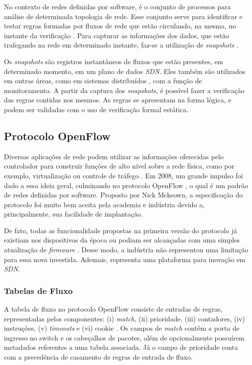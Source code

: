 \documentclass[12pt]{article}
\begin{document}
No contexto de redes definidas por software, é o conjunto de processos para análise de determinada topologia de rede. 
Esse conjunto serve para identificar e testar regras formadas por fluxos de rede que estão circulando, na mesma, no instante da verificação \cite{8536203}.
Para capturar as informações dos dados, que estão trafegando na rede em determinado instante, faz-se a utilização de \textit{snapshots} \cite{8855530}.

Os \textit{snapshots} são registros instantâneos de fluxos que estão presentes, em determinado momento, em um plano de dados \textit{SDN}.
Eles também são utilizados em outras áreas, como em sistemas distribuídos \cite{7903947}, com a função de monitoramento.
A partir da captura dos \textit{snapshots}, é possível fazer a verificação das regras contidas nos mesmos.
As regras se apresentam na forma lógica, e podem ser validadas com o uso de verificação formal estática.

\subsection{Protocolo OpenFlow}
Diversas aplicações de rede podem utilizar as informações oferecidas pelo controlador para construir funções de alto nível sobre a rede física, como por exemplo, virtualização ou controle de tráfego  \cite{6936857}. 
Em 2008, um grande impulso foi dado a essa ideia geral, culminando no protocolo OpenFlow \cite{Mckeown_2008}, o qual é um padrão de redes definidas por software. Proposto por Nick Mckeown, a especificação do protocolo foi muito bem aceita pela academia e indústria devido a, principalmente, sua facilidade de implantação.

De fato, todas as funcionalidade propostas na primeira versão do protocolo já existiam nos dispositivos da época ou podiam ser alcançadas com uma simples atualização de \textit{firmware} \cite{Feamster_2010}.
Desse modo, a indústria não representou uma limitação para essa nova investida. Ademais, representa uma plataforma para inovação em \textit{SDN}.

\subsubsection{Tabelas de Fluxo}
A tabela de fluxo no protocolo OpenFlow consiste de entradas de regras, representadas pelos componentes: (i) \textit{match}, (ii) prioridade, (iii) contadores, (iv) instruções, (v) \textit{timeouts} e (vi) cookie \cite{654135}.
Os campos de \textit{match} contêm a porta de ingresso no switch e os cabeçalhos de pacotes, além de opcionalmente possuírem metadados referentes a uma tabela associada.
Já o campo de prioridade conta com a precedência de casamento de regras de entrada de fluxo.
\end{document}
